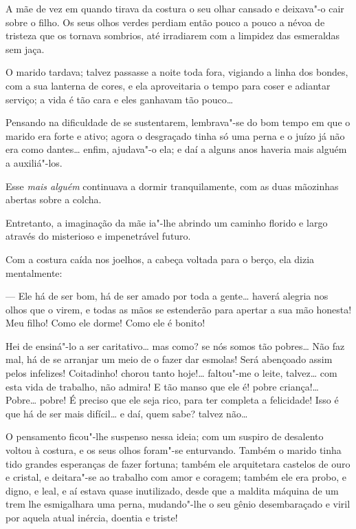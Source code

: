 A mãe de vez em quando tirava da costura o seu olhar cansado e deixava"-o
cair sobre o filho. Os seus olhos verdes perdiam então pouco a pouco a
névoa de tristeza que os tornava sombrios, até irradiarem com a limpidez
das esmeraldas sem jaça.

O marido tardava; talvez passasse a noite toda fora, vigiando a linha
dos bondes, com a sua lanterna de cores, e ela aproveitaria o tempo para
coser e adiantar serviço; a vida é tão cara e eles ganhavam tão pouco\ldots{}

Pensando na dificuldade de se sustentarem, lembrava"-se do bom tempo em
que o marido era forte e ativo; agora o desgraçado tinha só uma perna e
o juízo já não era como dantes\ldots{} enfim, ajudava"-o ela; e daí a alguns
anos haveria mais alguém a auxiliá"-los.

Esse \emph{mais alguém} continuava a dormir tranquilamente, com as duas
mãozinhas abertas sobre a colcha.

Entretanto, a imaginação da mãe ia"-lhe abrindo um caminho florido e
largo através do misterioso e impenetrável futuro.

Com a costura caída nos joelhos, a cabeça voltada para o berço, ela
dizia mentalmente:

--- Ele há de ser bom, há de ser amado por toda a gente\ldots{} haverá
alegria nos olhos que o virem, e todas as mãos se estenderão para
apertar a sua mão honesta! Meu filho! Como ele dorme! Como ele é bonito!

Hei de ensiná"-lo a ser caritativo\ldots{} mas como? se nós somos tão
pobres\ldots{} Não faz mal, há de se arranjar um meio de o fazer dar esmolas!
Será abençoado assim pelos infelizes! Coitadinho! chorou tanto hoje!\ldots{}
faltou"-me o leite, talvez\ldots{} com esta vida de trabalho, não admira! E
tão manso que ele é! pobre criança!\ldots{} Pobre\ldots{} pobre! É preciso que ele
seja rico, para ter completa a felicidade! Isso é que há de ser mais
difícil\ldots{} e daí, quem sabe? talvez não\ldots{}

O pensamento ficou"-lhe suspenso nessa ideia; com um suspiro de desalento
voltou à costura, e os seus olhos foram"-se enturvando. Também o marido
tinha tido grandes esperanças de fazer fortuna; também ele arquitetara
castelos de ouro e cristal, e deitara"-se ao trabalho com amor e coragem;
também ele era probo, e digno, e leal, e aí estava quase inutilizado,
desde que a maldita máquina de um trem lhe esmigalhara uma perna,
mudando"-lhe o seu gênio desembaraçado e viril por aquela atual inércia,
doentia e triste!

